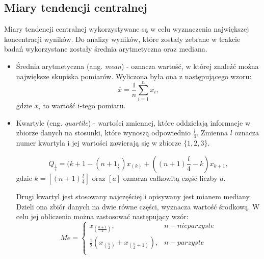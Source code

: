 \documentclass[a4paper,12pt,numbers=noenddot]{report}
\begin{document}
\subsection{Miary tendencji centralnej}
Miary tendencji centralnej wykorzystywane są w celu wyznaczenia największej koncentracji wyników. Do analizy wyników, które zostały zebrane w trakcie badań wykorzystane zostały średnia arytmetyczna oraz mediana.
\begin{itemize}
\item
Średnia arytmetyczna (ang. \textit{mean}) - oznacza wartość, w której znaleźć można największe skupiska pomiarów. 
Wyliczona była ona z następującego wzoru:
\begin{equation}
\label{eq_mean}
\overline{x} = \frac{1}{n}\sum_{i=1}^{n}x_{i},
\end{equation}
gdzie $x_{i}$ to wartość i-tego pomiaru.

\item
Kwartyle (eng. \textit{quartile}) - wartości zmiennej, które oddzielają informacje w zbiorze danych na stosunki, które wynoszą odpowiednio $\frac{l}{4}$. Zmienna $l$ oznacza numer kwartyla i jej wartości zawierają się w zbiorze  $\{1,2,3\}$.

\begin{equation}
\label{eq_quart}
Q_{\frac{l}{4}}=(k+1-(n+1_\frac{l}{4})x_{(k)}+((n+1)\frac{l}{4}-k)x_{k+1},
\end{equation}
gdzie $k = [(n+1)\frac{l}{4}]$ oraz $[a]$ oznacza całkowitą część liczby $a$.

Drugi kwartyl jest stosowany najczęściej i opisywany jest mianem mediany. Dzieli ona zbiór danych na dwie równe części, wyznacza wartość środkową. W celu jej obliczenia można zastosować następujący wzór:
\begin{equation}
\label{eq_median}
Me=\left\{
        \begin{array}{ll}
             x_{(\frac{n+1}{2})}, & n - nieparzyste\\
             \frac{1}{2}(x_{(\frac{n}{2})}+x_{(\frac{n}{2}+1)}), & n - parzyste\\
             \end{array}
        \right.
\end{equation}
\end{itemize}
\end{document}
